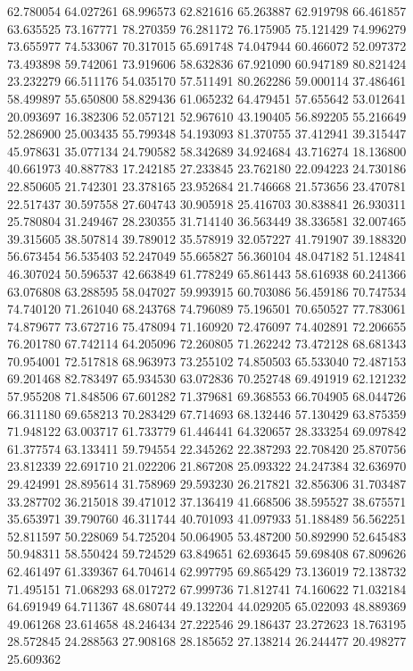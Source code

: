 62.780054
64.027261
68.996573
62.821616
65.263887
62.919798
66.461857
63.635525
73.167771
78.270359
76.281172
76.175905
75.121429
74.996279
73.655977
74.533067
70.317015
65.691748
74.047944
60.466072
52.097372
73.493898
59.742061
73.919606
58.632836
67.921090
60.947189
80.821424
23.232279
66.511176
54.035170
57.511491
80.262286
59.000114
37.486461
58.499897
55.650800
58.829436
61.065232
64.479451
57.655642
53.012641
20.093697
16.382306
52.057121
52.967610
43.190405
56.892205
55.216649
52.286900
25.003435
55.799348
54.193093
81.370755
37.412941
39.315447
45.978631
35.077134
24.790582
58.342689
34.924684
43.716274
18.136800
40.661973
40.887783
17.242185
27.233845
23.762180
22.094223
24.730186
22.850605
21.742301
23.378165
23.952684
21.746668
21.573656
23.470781
22.517437
30.597558
27.604743
30.905918
25.416703
30.838841
26.930311
25.780804
31.249467
28.230355
31.714140
36.563449
38.336581
32.007465
39.315605
38.507814
39.789012
35.578919
32.057227
41.791907
39.188320
56.673454
56.535403
52.247049
55.665827
56.360104
48.047182
51.124841
46.307024
50.596537
42.663849
61.778249
65.861443
58.616938
60.241366
63.076808
63.288595
58.047027
59.993915
60.703086
56.459186
70.747534
74.740120
71.261040
68.243768
74.796089
75.196501
70.650527
77.783061
74.879677
73.672716
75.478094
71.160920
72.476097
74.402891
72.206655
76.201780
67.742114
64.205096
72.260805
71.262242
73.472128
68.681343
70.954001
72.517818
68.963973
73.255102
74.850503
65.533040
72.487153
69.201468
82.783497
65.934530
63.072836
70.252748
69.491919
62.121232
57.955208
71.848506
67.601282
71.379681
69.368553
66.704905
68.044726
66.311180
69.658213
70.283429
67.714693
68.132446
57.130429
63.875359
71.948122
63.003717
61.733779
61.446441
64.320657
28.333254
69.097842
61.377574
63.133411
59.794554
22.345262
22.387293
22.708420
25.870756
23.812339
22.691710
21.022206
21.867208
25.093322
24.247384
32.636970
29.424991
28.895614
31.758969
29.593230
26.217821
32.856306
31.703487
33.287702
36.215018
39.471012
37.136419
41.668506
38.595527
38.675571
35.653971
39.790760
46.311744
40.701093
41.097933
51.188489
56.562251
52.811597
50.228069
54.725204
50.064905
53.487200
50.892990
52.645483
50.948311
58.550424
59.724529
63.849651
62.693645
59.698408
67.809626
62.461497
61.339367
64.704614
62.997795
69.865429
73.136019
72.138732
71.495151
71.068293
68.017272
67.999736
71.812741
74.160622
71.032184
64.691949
64.711367
48.680744
49.132204
44.029205
65.022093
48.889369
49.061268
23.614658
48.246434
27.222546
29.186437
23.272623
18.763195
28.572845
24.288563
27.908168
28.185652
27.138214
26.244477
20.498277
25.609362
